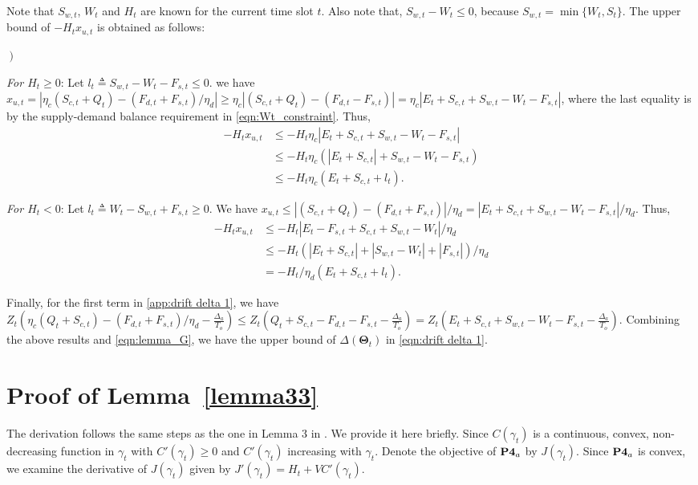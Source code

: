 \documentclass[journal]{IEEEtran}
\def\Thetabf{\boldsymbol \Theta}
\def\nn{\nonumber}
\begin{document}
Note that $S_{w,t}$, $W_t$ and $H_t$ are known for the current time slot $t$. Also note that, $S_{w,t}- W_t \le 0$, because $S_{w,t}=\min\{W_t,S_t\}$.  The upper bound of $-H_tx_{u,t}$ is obtained as follows:
\begin{list}{{\it {}$\left.\right)$~}}
{
\setlength\leftmargin{0em}
\setlength{}
\setlength{}
\setlength\itemsep{0em}
}
\item {\it For $H_t\geq0$}: Let $l_t\triangleq S_{w,t}-W_t-F_{s,t}\le 0$. we have $x_{u,t}=|\eta_c(S_{c,t}+Q_t)-(F_{d,t}+F_{s,t})/\eta_d|\ge \eta_c|(S_{c,t}+Q_t)- (F_{d,t}-F_{s,t})|=\eta_c|E_t+S_{c,t}+S_{w,t}-W_t-F_{s,t}|$, where the last equality is by the supply-demand balance requirement in \eqref{eqn:Wt_constraint}. Thus,
\begin{align*}
-H_tx_{u,t}&\le-H_t\eta_c|E_t+S_{c,t}+S_{w,t}-W_t-F_{s,t}|\nn \\
&\leq-H_t\eta_c(|E_t+S_{c,t}|+S_{w,t}-W_t-F_{s,t}) \nn\\
&\leq-H_t\eta_c(E_t+S_{c,t}+l_t).
\end{align*}
\item {\it For $H_t<0$}: Let $l_t\triangleq W_t-S_{w,t}+F_{s,t}\ge 0$. We have $x_{u,t}\le|(S_{c,t}+Q_t)-(F_{d,t}+F_{s,t})|/\eta_d=|E_t+S_{c,t}+S_{w,t}-W_t-F_{s,t}|/\eta_d$. Thus,
\begin{align*}
-H_tx_{u,t}&\le-H_t|E_t-F_{s,t}+S_{c,t}+S_{w,t}-W_t|/\eta_d\\
&\leq -H_t(|E_t+S_{c,t}|+|S_{w,t}-W_t|+|F_{s,t}|)/\eta_d\\
&=-H_t/\eta_d(E_t+S_{c,t}+l_t).
\end{align*}
\end{list}
Finally, for the first term in \eqref{app:drift delta 1}, we have
$Z_t(\eta_c(Q_t+S_{c,t})-(F_{d,t}+F_{s,t})/{\eta_d}-\frac{\Delta_a}{T_o})\le Z_t (Q_t+S_{c,t}-F_{d,t}-F_{s,t}-\frac{\Delta_a}{T_o})=Z_t (E_t+S_{c,t}+S_{w,t}-W_t-F_{s,t}-\frac{\Delta_a}{T_o})$.
Combining the above results and \eqref{eqn:lemma_G}, we have the upper bound of $\Delta(\Thetabf_t)$ in \eqref{eqn:drift delta 1}.
\endIEEEproof

\section{Proof of Lemma~\ref{lemma33}}\label{app:lemma33}
\IEEEproof
The derivation follows the same steps as the one in Lemma 3 in \cite{Li&Dong:JSAC15}. We provide it here briefly. Since $C(\gamma_t)$ is a continuous, convex, non-decreasing function in $\gamma_t$ with $C'(\gamma_t)\ge 0$ and $C'(\gamma_t)$ increasing with $\gamma_t$. Denote the objective of $\text{\bf P4}_a$ by $J(\gamma_t)$. Since $\text{\bf P4}_a$ is convex, we examine the derivative of $J(\gamma_t)$ given by $J'(\gamma_t) = H_t+VC'(\gamma_t)$.
\end{document}
